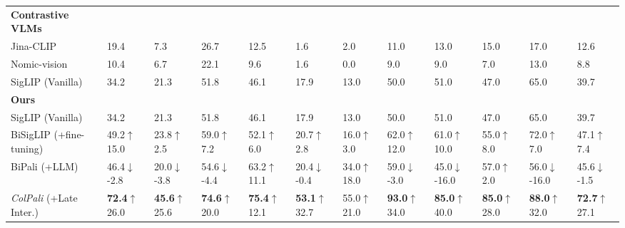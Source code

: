 \begin{table}[ht]
{\begin{tabular}{ll@{\hskip 0.5em}l@{\hskip 0.5em}l@{\hskip 0.5em}l@{\hskip 0.5em}l@{\hskip 0.5em}l@{\hskip 0.5em}l@{\hskip 0.5em}l@{\hskip 0.5em}l@{\hskip 0.5em}l|@{\hskip 0.5em}l}
    \multicolumn{0}{l}{\textbf{Contrastive VLMs}}\\
    Jina-CLIP & 19.4 & 7.3 & 26.7 & 12.5 & 1.6 & 2.0 & 11.0 & 13.0 & 
    15.0 & 17.0 & 12.6\\
    Nomic-vision & 10.4 & 6.7 & 22.1 & 9.6 & 1.6 & 0.0 & 9.0 & 9.0 & 7.0 & 13.0 & 8.8\\
    SigLIP \tiny(Vanilla)& 34.2 & 21.3 & 51.8 & 46.1 & 17.9 & 13.0 & 50.0 & 51.0 & 47.0 & 65.0 & 39.7 \\
    
    \midrule
    \multicolumn{0}{l}{\textbf{Ours}}\\
    SigLIP \tiny(Vanilla)& 34.2 & 21.3 & 51.8 & 46.1 & 17.9 & 13.0 & 50.0 & 51.0 & 47.0 & 65.0 & 39.7 \\
    BiSigLIP \tiny (+fine-tuning) & 49.2\textcolor{green!75!black}{\tiny $\uparrow$15.0} & 23.8\textcolor{green!75!black}{\tiny $\uparrow$2.5} & 59.0\textcolor{green!75!black}{\tiny $\uparrow$7.2} & 52.1\textcolor{green!75!black}{\tiny $\uparrow$6.0} & 20.7\textcolor{green!75!black}{\tiny $\uparrow$2.8} & 16.0\textcolor{green!75!black}{\tiny $\uparrow$3.0} & 62.0\textcolor{green!75!black}{\tiny $\uparrow$12.0} & 61.0\textcolor{green!75!black}{\tiny $\uparrow$10.0} & 55.0\textcolor{green!75!black}{\tiny $\uparrow$8.0} & 72.0\textcolor{green!75!black}{\tiny $\uparrow$7.0} & 47.1\textcolor{green!75!black}{\tiny $\uparrow$7.4}\\
    BiPali \tiny (+LLM) & 46.4\textcolor{red!75!black}{\tiny $\downarrow$-2.8} & 20.0\textcolor{red!75!black}{\tiny $\downarrow$-3.8} & 54.6\textcolor{red!75!black}{\tiny $\downarrow$-4.4} & 63.2\textcolor{green!75!black}{\tiny $\uparrow$11.1} & 20.4\textcolor{red!75!black}{\tiny $\downarrow$-0.4} & 34.0\textcolor{green!75!black}{\tiny $\uparrow$18.0} & 59.0\textcolor{red!75!black}{\tiny $\downarrow$-3.0} & 45.0\textcolor{red!75!black}{\tiny $\downarrow$-16.0} & 57.0\textcolor{green!75!black}{\tiny $\uparrow$2.0} & 56.0\textcolor{red!75!black}{\tiny $\downarrow$-16.0} & 45.6\textcolor{red!75!black}{\tiny $\downarrow$-1.5}\\
    \textit{ColPali} \tiny (+Late Inter.) & \textbf{72.4}\textcolor{green!75!black}{\tiny $\uparrow$26.0} & \textbf{45.6}\textcolor{green!75!black}{\tiny $\uparrow$25.6} & \textbf{74.6}\textcolor{green!75!black}{\tiny $\uparrow$20.0} & \textbf{75.4}\textcolor{green!75!black}{\tiny $\uparrow$12.1} & \textbf{53.1}\textcolor{green!75!black}{\tiny $\uparrow$32.7} & 55.0\textcolor{green!75!black}{\tiny $\uparrow$21.0} & \textbf{93.0}\textcolor{green!75!black}{\tiny $\uparrow$34.0} & \textbf{85.0}\textcolor{green!75!black}{\tiny $\uparrow$40.0} & \textbf{85.0}\textcolor{green!75!black}{\tiny $\uparrow$28.0} & \textbf{88.0}\textcolor{green!75!black}{\tiny $\uparrow$32.0} & \textbf{72.7}\textcolor{green!75!black}{\tiny $\uparrow$27.1}\\
    \bottomrule
    \end{tabular}
    }
    


\end{table}
